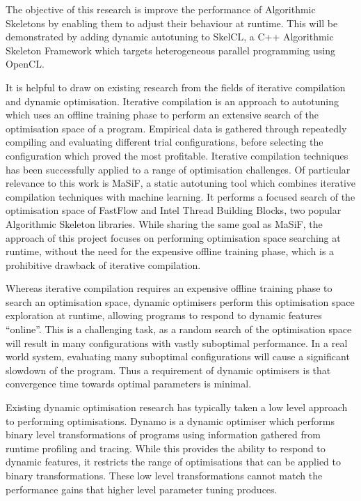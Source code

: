 The objective of this research is improve the performance of
Algorithmic Skeletons by enabling them to adjust their behaviour at
runtime. This will be demonstrated by adding dynamic autotuning to
SkelCL, a C++ Algorithmic Skeleton Framework which targets
heterogeneous parallel programming using OpenCL.

It is helpful to draw on existing research from the fields of
iterative compilation and dynamic optimisation. Iterative compilation
is an approach to autotuning which uses an offline training phase to
perform an extensive search of the optimisation space of a program.
Empirical data is gathered through repeatedly compiling and evaluating
different trial configurations, before selecting the configuration
which proved the most profitable. Iterative compilation techniques has
been successfully applied to a range of optimisation challenges. Of
particular relevance to this work is MaSiF, a static autotuning tool
which combines iterative compilation techniques with machine learning.
It performs a focused search of the optimisation space of FastFlow and
Intel Thread Building Blocks, two popular Algorithmic Skeleton
libraries. While sharing the same goal as MaSiF, the approach of this
project focuses on performing optimisation space searching at runtime,
without the need for the expensive offline training phase, which is a
prohibitive drawback of iterative compilation.

Whereas iterative compilation requires an expensive offline training
phase to search an optimisation space, dynamic optimisers perform this
optimisation space exploration at runtime, allowing programs to
respond to dynamic features ``online''. This is a challenging task, as
a random search of the optimisation space will result in many
configurations with vastly suboptimal performance. In a real world
system, evaluating many suboptimal configurations will cause a
significant slowdown of the program. Thus a requirement of dynamic
optimisers is that convergence time towards optimal parameters is
minimal.

Existing dynamic optimisation research has typically taken a low level
approach to performing optimisations. Dynamo is a dynamic optimiser
which performs binary level transformations of programs using
information gathered from runtime profiling and tracing. While this
provides the ability to respond to dynamic features, it restricts the
range of optimisations that can be applied to binary
transformations. These low level transformations cannot match the
performance gains that higher level parameter tuning produces.


